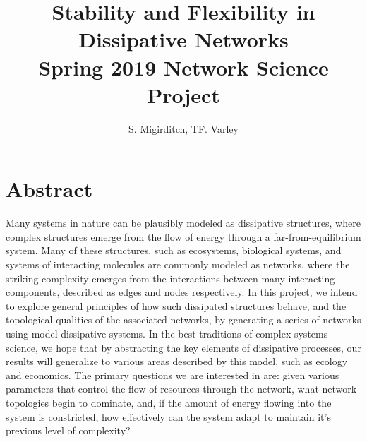 \documentclass{paper}
\title{Stability and Flexibility in Dissipative Networks \\ \textnormal{Spring 2019 Network Science Project}}
\author{S. Migirditch, TF. Varley}
\begin{document}
	
	\maketitle
	\section*{Abstract}
	Many systems in nature can be plausibly modeled as dissipative structures, where complex structures emerge from the flow of energy through a far-from-equilibrium system. Many of these structures, such as ecosystems, biological systems, and systems of interacting molecules are commonly modeled as networks, where the striking complexity emerges from the interactions between many interacting components, described as edges and nodes respectively. In this project, we intend to explore general principles of how such dissipated structures behave, and the topological qualities of the associated networks, by generating a series of networks using model dissipative systems. In the best traditions of complex systems science, we hope that by abstracting the key elements of dissipative processes, our results will generalize to various areas described by this model, such as ecology and economics. The primary questions we are interested in are: given various parameters that control the flow of resources through the network, what network topologies begin to dominate, and, if the amount of energy flowing into the system is constricted, how effectively can the system adapt to maintain it's previous level of complexity? 
	\newline
\end{document}
